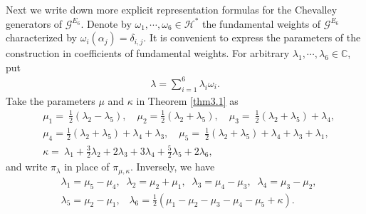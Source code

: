 \documentclass[12pt]{article}
\numberwithin{equation}{section}
\theoremstyle{definition}
\theoremstyle{remark}
\begin{document}
Next we write down more explicit representation formulas for the Chevalley generators of $\mathscr{G}^{E_6}$. Denote by $\omega_1,\cdots,\omega_6\in \mathscr{H}^*$ the fundamental weights of $\mathscr{G}^{E_6}$ characterized by $\omega_i(\alpha_j)=\delta_{i,j}$. It is convenient to express the parameters of the construction in coefficients of fundamental weights.
For arbitrary $\lambda_1,\cdots,\lambda_6\in\mathbb{C}$, put
\begin{eqnarray}
	\lambda=\sum_{i=1}^6\lambda_i\omega_i.
\end{eqnarray}
Take the parameters $\mu$ and $\kappa$ in Theorem \ref{thm3.1} as
\begin{eqnarray}
	&\mu_1=\:\frac{1}{2}(\lambda_2-\lambda_5),\quad\mu_2=\frac{1}{2}(\lambda_2+\lambda_5),\quad \mu_3=\:\frac{1}{2}(\lambda_2+\lambda_5)+\lambda_4, \label{3.122}\\
	&\mu_4=\frac{1}{2}(\lambda_2+\lambda_5)+\lambda_4+\lambda_3,\quad
	\mu_5=\:\frac{1}{2}(\lambda_2+\lambda_5)+\lambda_4+\lambda_3+\lambda_1,\\
	&\kappa=\:\lambda_1+\frac{3}{2}\lambda_2+2\lambda_3+3\lambda_4+\frac{5}{2}\lambda_5+2\lambda_6,\label{3.124}
\end{eqnarray}
and write $\pi_{\lambda}$ in place of $\pi_{\mu,\kappa}$.
Inversely, we have
\begin{eqnarray}
	&\lambda_1=\mu_5-\mu_4,\;\;\lambda_2=\mu_2+\mu_1,\;\;\lambda_3=\mu_4-\mu_3,\;\;\lambda_4=\mu_3-\mu_2,\\
	&\lambda_5=\mu_2-\mu_1,\;\;\;\lambda_6=\frac{1}{2}(\mu_1-\mu_2-\mu_3-\mu_4-\mu_5+\kappa). \label{lam6}
\end{eqnarray}
\end{document}
